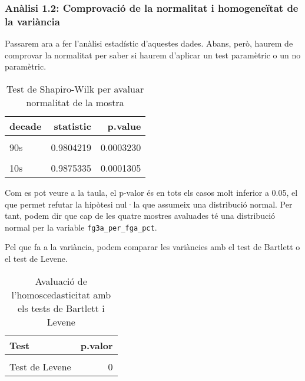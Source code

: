 \documentclass[
]{article}
\begin{document}
\hypertarget{anuxe0lisi-1.2-comprovaciuxf3-de-la-normalitat-i-homogeneuxeftat-de-la-variuxe0ncia}{%
\subsubsection{Anàlisi 1.2: Comprovació de la normalitat i homogeneïtat
de la
variància}\label{anuxe0lisi-1.2-comprovaciuxf3-de-la-normalitat-i-homogeneuxeftat-de-la-variuxe0ncia}}

Passarem ara a fer l'anàlisi estadístic d'aquestes dades. Abans, però,
haurem de comprovar la normalitat per saber si haurem d'aplicar un test
paramètric o un no paramètric.

\begin{table}[!h]

\caption{\label{tab:unnamed-chunk-17}Test de Shapiro-Wilk per avaluar normalitat de la mostra}
\centering
\begin{tabular}[t]{lrr}
\toprule
decade & statistic & p.value\\
\midrule
\cellcolor{gray!6}{80s} & \cellcolor{gray!6}{0.8818854} & \cellcolor{gray!6}{0.0000000}\\
90s & 0.9804219 & 0.0003230\\
\cellcolor{gray!6}{00s} & \cellcolor{gray!6}{0.9900004} & \cellcolor{gray!6}{0.0045421}\\
10s & 0.9875335 & 0.0001305\\
\bottomrule
\end{tabular}
\end{table}

Com es pot veure a la taula, el p-valor és en tots els casos molt
inferior a 0.05, el que permet refutar la hipòtesi nul·la que assumeix
una distribució normal. Per tant, podem dir que cap de les quatre
mostres avaluades té una distribució normal per la variable
\texttt{fg3a\_per\_fga\_pct}.

Pel que fa a la variància, podem comparar les variàncies amb el test de
Bartlett o el test de Levene.

\begin{table}[!h]

\caption{\label{tab:unnamed-chunk-18}Avaluació de l'homoscedasticitat amb els tests de Bartlett i Levene}
\centering
\begin{tabular}[t]{lr}
\toprule
Test & p.valor\\
\midrule
\cellcolor{gray!6}{Test de Bartlett} & \cellcolor{gray!6}{0}\\
Test de Levene & 0\\
\bottomrule
\end{tabular}
\end{table}
\end{document}

